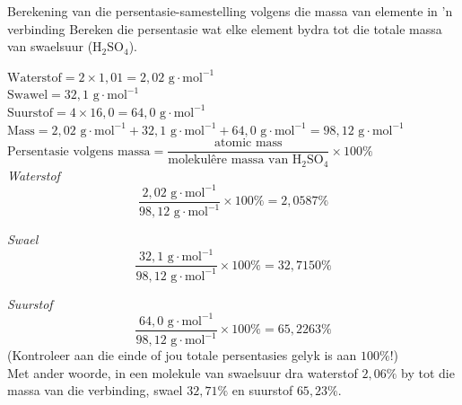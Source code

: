       \begin{wex}{Berekening van die persentasie-samestelling volgens die  massa van elemente in  'n verbinding}
{
Bereken die persentasie wat elke element bydra tot die totale massa van swaelsuur (${\text{H}}_{2}{\text{SO}}_{4}$).
      }
{
$\text{Waterstof}=2 \times 1,01 = 2,02 \text{ g} \cdot \text{mol}^{-1}$ \\ 
$\text{Swawel}=32,1 \text{ g} \cdot \text{mol}^{-1}$ \\
$\text{Suurstof}=4 \times 16,0 = 64,0 \text{ g} \cdot \text{mol}^{-1}$
$\text{Mass}=2,02 \text{ g} \cdot \text{mol}^{-1} + 32,1 \text{ g} \cdot \text{mol}^{-1} + 64,0 \text{ g} \cdot \text{mol}^{-1} = 98,12 \text{ g} \cdot \text{mol}^{-1}$
      \label{m38712*id280688}$\text{Persentasie volgens massa}=\dfrac{\text{atomic mass}}{\text{molekul\^{e}re massa van H}{}_{2}\text{SO}{}_{4}} \times 100\%$ \\

        \textsl{Waterstof}      
      \label{m38712*id280735}\nopagebreak\noindent{}        
    \begin{equation*}
    \frac{2,02 \text{ g} \cdot \text{mol}^{-1}}{98,12 \text{ g} \cdot \text{mol}^{-1}}\ensuremath{\times}100\%=2,0587\%
      \end{equation*}

        \textsl{Swael}      
      \label{m38712*id280786}\nopagebreak\noindent{}        
    \begin{equation*}
    \frac{32,1 \text{ g} \cdot \text{mol}^{-1}}{98,12 \text{ g} \cdot \text{mol}^{-1}}\ensuremath{\times}100\%=32,7150\%
      \end{equation*}

        \textsl{Suurstof}     
      \label{m38712*id280837}\nopagebreak\noindent{}
    \begin{equation*}
    \frac{64,0 \text{ g} \cdot \text{mol}^{-1}}{98,12 \text{ g} \cdot \text{mol}^{-1}}\ensuremath{\times}100\%=65,2263\%
      \end{equation*}
      \label{m38712*id280876}(Kontroleer aan die einde of jou totale persentasies gelyk is aan $100\%$!) \\
      \label{m38712*id280880}Met ander woorde, in een molekule van swaelsuur dra waterstof $2,06\%$ by tot die massa van die verbinding, swael $32,71\%$ en suurstof $65,23\%$. 
}
    \end{wex}
